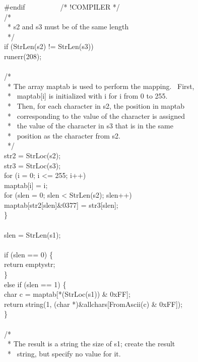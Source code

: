 \begin{iconcode}
\#endif\ \ \ \ \ \ \ \ \ \ /* !COMPILER */\\
\>\>\>/*\\
\>\>\>\ * s2 and s3 must be of the same length\\
\>\>\>\ */\\
\>\>\>if (StrLen(s2) != StrLen(s3))\\
\>\>\>\>runerr(208);\\
\\
\>\>\>/*\\
\>\>\>\ * The array maptab is used to perform the mapping. \ First,\\
\>\>\>\ * \ maptab[i] is initialized with i for i from 0 to 255.\\
\>\>\>\ * \ Then, for each character in s2, the position in maptab\\
\>\>\>\ * \ corresponding to the value of the character is assigned\\
\>\>\>\ * \ the value of the character in s3 that is in the same\\
\>\>\>\ * \ position as the character from s2.\\
\>\>\>\ */\\
\>\>\>str2 = StrLoc(s2);\\
\>\>\>str3 = StrLoc(s3);\\
\>\>\>for (i = 0; i <= 255; i++)\\
\>\>\>\>maptab[i] = i;\\
\>\>\>for (slen = 0; slen < StrLen(s2); slen++)\\
\>\>\>\>maptab[str2[slen]\&0377] = str3[slen];\\
\>\>\>\}\\
\\
\>\>\>slen = StrLen(s1);\\
\\
\>\>\>if (slen == 0) \{\\
\>\>\>\>return emptystr;\\
\>\>\>\}\\
\>\>\>else if (slen == 1) \{\\
\>\>\>\>char c = maptab[*(StrLoc(s1)) \& 0xFF];\\
\>\>\>\>return string(1, (char *)\&allchars[FromAscii(c) \& 0xFF]);\\
\>\>\>\}\\
\\
\>\>\>/*\\
\>\>\>\ * The result is a string the size of s1; create the result\\
\>\>\>\ * \ string, but specify no value for it.\\

\end{iconcode}
